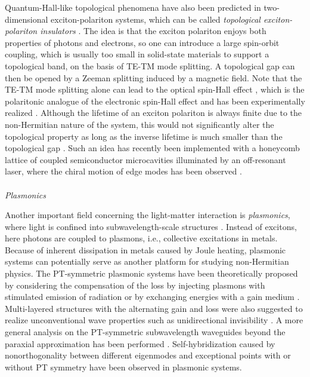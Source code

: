 \documentclass{tADP2e}
\theoremstyle{plain}
\theoremstyle{plain}
\theoremstyle{definition}
\begin{document}
Quantum-Hall-like topological phenomena have also been predicted in two-dimensional exciton-polariton systems, which can be called \emph{topological exciton-polariton insulators} \cite{RG15,NAV15}. The idea is that the exciton polariton enjoys both properties of photons and electrons, so one can introduce a large spin-orbit coupling, which is usually too small in solid-state materials to support a topological band, on the basis of TE-TM mode splitting. A topological gap can then be opened by a Zeeman splitting induced by a magnetic field. Note that the TE-TM mode splitting alone can lead to the optical spin-Hall effect \cite{KA05}, which is the polaritonic analogue of the electronic spin-Hall effect \cite{HJE99,KYK04} and has been experimentally realized \cite{CL07}. Although the lifetime of an exciton polariton is always finite due to the non-Hermitian nature of the system, this would not significantly alter the topological property as long as the inverse lifetime is much smaller than the topological gap \cite{RG15,NAV15}. Such an idea has recently been implemented with a honeycomb lattice of coupled semiconductor microcavities illuminated by an off-resonant laser, where the chiral motion of edge modes has been observed \cite{SK18}.
\\ \\ {\it Plasmonics}

\vspace{3pt}
\noindent
Another important field concerning the light-matter interaction is {\it plasmonics}, where light is confined into subwavelength-scale structures \cite{TMS13}. Instead of excitons,  
here photons are coupled to plasmons, i.e., collective excitations in metals. Because of inherent dissipation in metals caused by Joule heating, plasmonic systems can potentially serve as another platform for studying non-Hermitian physics. 
The PT-symmetric plasmonic systems have been theoretically proposed by considering the compensation of  the loss by injecting plasmons with stimulated emission of radiation \cite{BDJ03} or by exchanging energies with a gain medium \cite{Benisty:11,Lupu:13}. 
Multi-layered structures with the alternating gain and loss were also suggested to realize unconventional wave properties such as  unidirectional invisibility \cite{AH14,AH142}. 
A more general analysis on the PT-symmetric subwavelength waveguides beyond the paraxial approximation has been performed \cite{Huang:14}. Self-hybridization caused by nonorthogonality between different eigenmodes \cite{HLM18} and exceptional points with \cite{TA19} or without \cite{JHP19} PT symmetry have been observed in plasmonic systems.
\end{document}
